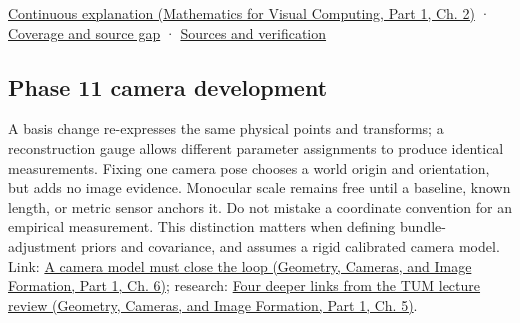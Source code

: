 \hypertarget{appendix-1bae9457dbc3-source-and-navigation}{}

\href{../02-Mathematics-for-Visual-Computing-P01/main.pdf\#nameddest=01-foundations-i-ch018-keep-the-promises-visible-while-moving-between-representations}{Continuous explanation (Mathematics for Visual Computing, Part 1, Ch. 2)} · \hyperref[appendix-fd090d982a15-phase-7---parts-601-700]{Coverage and source gap} · \hyperref[appendix-a103e7846d21-phase-7---source-analysis-and-verification]{Sources and verification}

\subsection{Phase 11 camera development}\label{appendix-1bae9457dbc3-phase-11-camera-development}

\hypertarget{appendix-1bae9457dbc3-phase-11-camera-development}{}

A basis change re-expresses the same physical points and transforms; a reconstruction gauge allows different parameter assignments to produce identical measurements. Fixing one camera pose chooses a world origin and orientation, but adds no image evidence. Monocular scale remains free until a baseline, known length, or metric sensor anchors it. Do not mistake a coordinate convention for an empirical measurement. This distinction matters when defining bundle-adjustment priors and covariance, and assumes a rigid calibrated camera model. Link: \href{../03-Geometry-Cameras-and-Image-Formation-P01/main.pdf\#nameddest=02-foundations-ii-ch037-a-camera-model-must-close-the-loop}{A camera model must close the loop (Geometry, Cameras, and Image Formation, Part 1, Ch. 6)}; research: \href{../03-Geometry-Cameras-and-Image-Formation-P01/main.pdf\#nameddest=02-foundations-ii-ch036-four-deeper-links-from-the-tum-lecture-review}{Four deeper links from the TUM lecture review (Geometry, Cameras, and Image Formation, Part 1, Ch. 5)}.
